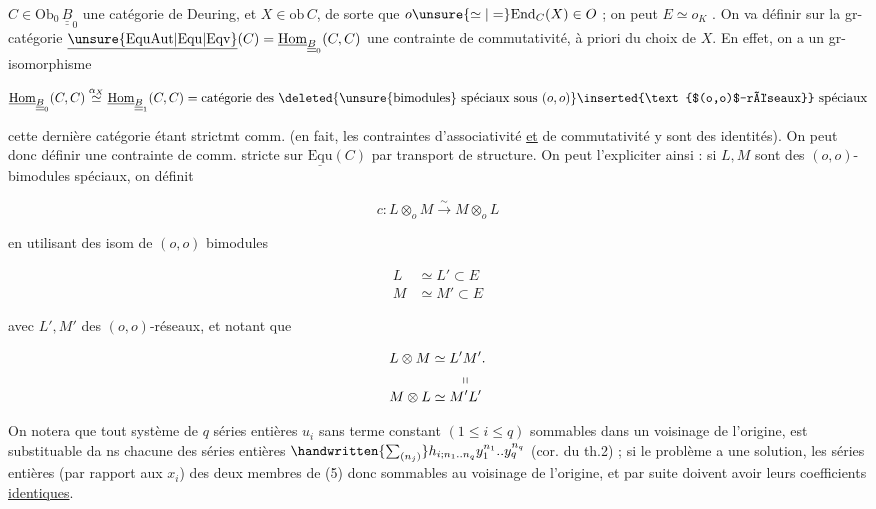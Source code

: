 $C\in\mathrm{Ob}_0\,\underline{\underline B}_0$ une catégorie de Deuring, et $X\in\mathrm{ob}\,C$, de sorte que $o\unsure{\simeq|=}\mathrm{End}_C(X)\in O$ ; on peut   $E\simeq o_K$ . On va définir sur la gr-catégorie $\underline{\unsure{\mathrm{EquAut}|\mathrm{Equ}|\mathrm{Eqv}}}(C)=\underline{\mathrm{Hom}}_{\underline{\underline B}_0}(C,C)$ une  contrainte de commutativité,   à priori du choix de $X$. En effet, on a un gr-isomorphisme

\[
\underline{\mathrm{Hom}}_{\underline{\underline B}_0}(C,C)
\overset{\alpha_X}{\simeq}
\underline{\mathrm{Hom}}_{\underline{\underline B}_1}(C,C)
=\text{catégorie des }\deleted{\text{\unsure{bimodules} spéciaux sous }(o,o)}
\inserted{\text{$(o,o)$-réseaux}}\text{ spéciaux}
\]

cette dernière catégorie étant  strictmt comm. (en fait, les contraintes d'associativité \uline{et} de commutativité y sont des identités). On peut donc définir une contrainte de comm. stricte sur $\underline{\mathrm{Equ}}(C)$ par transport de structure. On peut l'expliciter ainsi : si $L,M$ sont des $(o,o)$-bimodules spéciaux, on définit

\[
c:L\otimes_o M\overset{\sim}{\longrightarrow}M\otimes_o L
\]

en  utilisant des isom de $(o,o)$ bimodules

\[
\begin{aligned}L&\simeq L'\subset E\\M&\simeq M'\subset E\end{aligned}
\]

avec $L',M'$ des $(o,o)$-réseaux, et notant que

\[
\begin{aligned}
L\otimes M&\simeq L'M'.\\
&\phantom{\simeq L'}\shortparallel\\[-.5ex]
M\otimes L&\simeq M'L'
\end{aligned}
\]


On notera que tout système de $q$ séries entières $u_i$ sans terme constant $(1\leq i\leq q)$ sommables dans un voisinage de l'origine, est substituable da ns chacune des séries entières $\handwritten{\sum_{(n_j)}}h_{i;n_1..n_q}y_1^{n_1}..y_q^{n_q}$ (cor. du th.2) ; si le problème a une solution, les séries entières (par rapport aux $x_i$) des deux membres de (5)  donc sommables au voisinage de l'origine, et par suite doivent a\unsure{-|{}}voir leurs coefficients \uline{identiques}.

